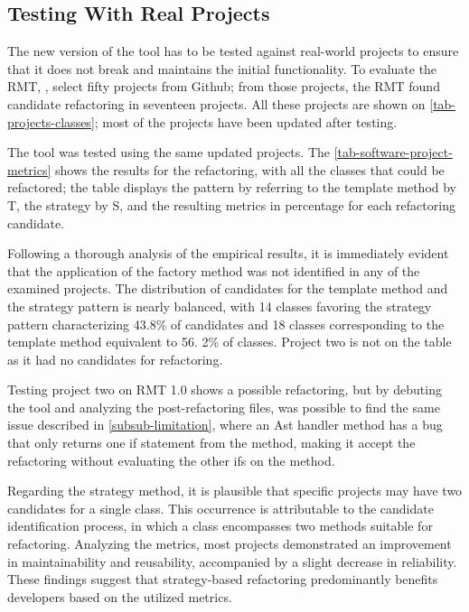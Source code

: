 \subsection{Testing With Real Projects}
\label{sub-testing-real}

The new version of the tool has to be tested against real-world projects to ensure that it does not break and maintains the initial functionality. To evaluate the RMT, \textcite{beluzzo2018abordagem}, select fifty projects from Github; from those projects, the RMT found candidate refactoring in seventeen projects. All these projects are shown on \cref{tab-projects-classes}; most of the projects have been updated after \cite{beluzzo2018abordagem} testing.



The tool was tested using the same updated projects. The \cref{tab-software-project-metrics} shows the results for the refactoring, with all the classes that could be refactored; the table displays the pattern by referring to the template method by T, the strategy by S, and the resulting metrics in percentage for each refactoring candidate.

Following a thorough analysis of the empirical results, it is immediately evident that the application of the factory method was not identified in any of the examined projects. The distribution of candidates for the template method and the strategy pattern is nearly balanced, with 14 classes favoring the strategy pattern characterizing 43.8\% of candidates and 18 classes corresponding to the template method equivalent to 56. 2\% of classes. Project two is not on the table as it had no candidates for refactoring.

Testing project two on RMT 1.0 shows a possible refactoring, but by debuting the tool and analyzing the post-refactoring files, was possible to find the same issue described in \cref{subsub-limitation}, where an Ast handler method has a bug that only returns one if statement from the method, making it accept the refactoring without evaluating the other ifs on the method.

Regarding the strategy method, it is plausible that specific projects may have two candidates for a single class. This occurrence is attributable to the candidate identification process, in which a class encompasses two methods suitable for refactoring. Analyzing the metrics, most projects demonstrated an improvement in maintainability and reusability, accompanied by a slight decrease in reliability. These findings suggest that strategy-based refactoring predominantly benefits developers based on the utilized metrics.

